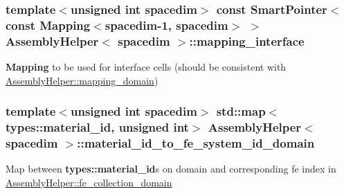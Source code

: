 \subsubsection[{\texorpdfstring{mapping\+\_\+interface}{mapping_interface}}]{\setlength{\rightskip}{0pt plus 5cm}template$<$unsigned int spacedim$>$ const {\bf Smart\+Pointer}$<$const {\bf Mapping}$<$spacedim-\/1, spacedim$>$ $>$ {\bf Assembly\+Helper}$<$ spacedim $>$\+::mapping\+\_\+interface\hspace{0.3cm}{\ttfamily [private]}}\hypertarget{class_assembly_helper_a055fde6217c18e62cd80188d0130c201}{}\label{class_assembly_helper_a055fde6217c18e62cd80188d0130c201}
{\bf Mapping} to be used for interface cells (should be consistent with \hyperlink{class_assembly_helper_a3fbb49461000dea8f64266f830709fad}{Assembly\+Helper\+::mapping\+\_\+domain}) 
\subsubsection[{\texorpdfstring{material\+\_\+id\+\_\+to\+\_\+fe\+\_\+system\+\_\+id\+\_\+domain}{material_id_to_fe_system_id_domain}}]{\setlength{\rightskip}{0pt plus 5cm}template$<$unsigned int spacedim$>$ std\+::map$<${\bf types\+::material\+\_\+id}, unsigned int$>$ {\bf Assembly\+Helper}$<$ spacedim $>$\+::material\+\_\+id\+\_\+to\+\_\+fe\+\_\+system\+\_\+id\+\_\+domain\hspace{0.3cm}{\ttfamily [private]}}\hypertarget{class_assembly_helper_a3045f80801fc31920efd161a268aae8e}{}\label{class_assembly_helper_a3045f80801fc31920efd161a268aae8e}
Map between {\bf types\+::material\+\_\+id}s on domain and corresponding fe index in \hyperlink{class_assembly_helper_af3803b0aad9853e6bf018c70be41e791}{Assembly\+Helper\+::fe\+\_\+collection\+\_\+domain} 
